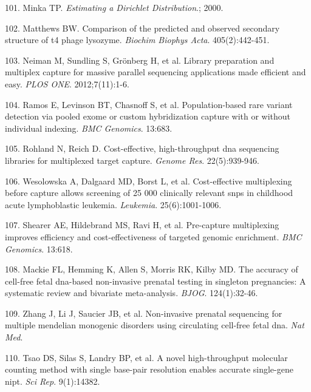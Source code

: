 \documentclass[11pt,letterpaper]{book}
\begin{document}
\leavevmode\hypertarget{ref-minka:2000aa}{}%
101. Minka TP. \emph{Estimating a Dirichlet Distribution}.; 2000.

\leavevmode\hypertarget{ref-matthews:1975aa}{}%
102. Matthews BW. Comparison of the predicted and observed secondary structure of t4 phage lysozyme. \emph{Biochim Biophys Acta}. 405(2):442-451.

\leavevmode\hypertarget{ref-neiman:2012aa}{}%
103. Neiman M, Sundling S, Grönberg H, et al. Library preparation and multiplex capture for massive parallel sequencing applications made efficient and easy. \emph{PLOS ONE}. 2012;7(11):1-6.

\leavevmode\hypertarget{ref-ramos:2012aa}{}%
104. Ramos E, Levinson BT, Chasnoff S, et al. Population-based rare variant detection via pooled exome or custom hybridization capture with or without individual indexing. \emph{BMC Genomics}. 13:683.

\leavevmode\hypertarget{ref-rohland:2012aa}{}%
105. Rohland N, Reich D. Cost-effective, high-throughput dna sequencing libraries for multiplexed target capture. \emph{Genome Res}. 22(5):939-946.

\leavevmode\hypertarget{ref-wesolowska:2011aa}{}%
106. Wesolowska A, Dalgaard MD, Borst L, et al. Cost-effective multiplexing before capture allows screening of 25 000 clinically relevant snps in childhood acute lymphoblastic leukemia. \emph{Leukemia}. 25(6):1001-1006.

\leavevmode\hypertarget{ref-shearer:2012aa}{}%
107. Shearer AE, Hildebrand MS, Ravi H, et al. Pre-capture multiplexing improves efficiency and cost-effectiveness of targeted genomic enrichment. \emph{BMC Genomics}. 13:618.

\leavevmode\hypertarget{ref-mackie:2017aa}{}%
108. Mackie FL, Hemming K, Allen S, Morris RK, Kilby MD. The accuracy of cell-free fetal dna-based non-invasive prenatal testing in singleton pregnancies: A systematic review and bivariate meta-analysis. \emph{BJOG}. 124(1):32-46.

\leavevmode\hypertarget{ref-zhang:2019aa}{}%
109. Zhang J, Li J, Saucier JB, et al. Non-invasive prenatal sequencing for multiple mendelian monogenic disorders using circulating cell-free fetal dna. \emph{Nat Med}.

\leavevmode\hypertarget{ref-tsao:2019ab}{}%
110. Tsao DS, Silas S, Landry BP, et al. A novel high-throughput molecular counting method with single base-pair resolution enables accurate single-gene nipt. \emph{Sci Rep}. 9(1):14382.
\end{document}
